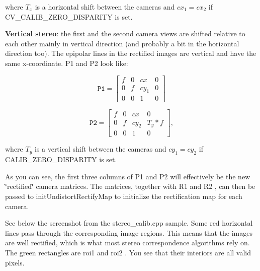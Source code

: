 where $T_x$ is a horizontal shift between the cameras and $cx_1=cx_2$ if C\+V\+\_\+\+C\+A\+L\+I\+B\+\_\+\+Z\+E\+R\+O\+\_\+\+D\+I\+S\+P\+A\+R\+I\+TY is set. 


\begin{DoxyItemize}
\item {\bfseries Vertical stereo}\+: the first and the second camera views are shifted relative to each other mainly in vertical direction (and probably a bit in the horizontal direction too). The epipolar lines in the rectified images are vertical and have the same x-\/coordinate. P1 and P2 look like\+: 
\end{DoxyItemize}

\[\texttt{P1} = \begin{bmatrix} f & 0 & cx & 0 \\ 0 & f & cy_1 & 0 \\ 0 & 0 & 1 & 0 \end{bmatrix}\] 

\[\texttt{P2} = \begin{bmatrix} f & 0 & cx & 0 \\ 0 & f & cy_2 & T_y*f \\ 0 & 0 & 1 & 0 \end{bmatrix} ,\] 

where $T_y$ is a vertical shift between the cameras and $cy_1=cy_2$ if C\+A\+L\+I\+B\+\_\+\+Z\+E\+R\+O\+\_\+\+D\+I\+S\+P\+A\+R\+I\+TY is set. 

As you can see, the first three columns of P1 and P2 will effectively be the new \char`\"{}rectified\char`\"{} camera matrices. The matrices, together with R1 and R2 , can then be passed to init\+Undistort\+Rectify\+Map to initialize the rectification map for each camera. 

See below the screenshot from the stereo\+\_\+calib.\+cpp sample. Some red horizontal lines pass through the corresponding image regions. This means that the images are well rectified, which is what most stereo correspondence algorithms rely on. The green rectangles are roi1 and roi2 . You see that their interiors are all valid pixels. 

 \mbox{\label{group__calib3d_ga2a00c796082466a7d1000418118e02d2}} 
